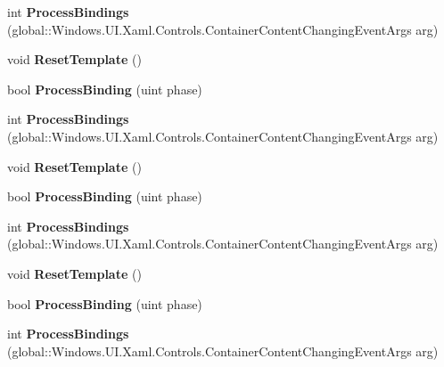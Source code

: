 \begin{DoxyCompactItemize}
int {\bfseries Process\+Bindings} (global\+::\+Windows.\+U\+I.\+Xaml.\+Controls.\+Container\+Content\+Changing\+Event\+Args arg)
\item 
\mbox{\label{interface_windows_1_1_u_i_1_1_xaml_1_1_i_data_template_extension_a247edf28ad06f9d06bda7086a8b91679}} 
void {\bfseries Reset\+Template} ()
\item 
\mbox{\label{interface_windows_1_1_u_i_1_1_xaml_1_1_i_data_template_extension_a9a74e478e1d35040a1bd752b3b29a2da}} 
bool {\bfseries Process\+Binding} (uint phase)
\item 
\mbox{\label{interface_windows_1_1_u_i_1_1_xaml_1_1_i_data_template_extension_a70216df3f493851508fde43160f8a095}} 
int {\bfseries Process\+Bindings} (global\+::\+Windows.\+U\+I.\+Xaml.\+Controls.\+Container\+Content\+Changing\+Event\+Args arg)
\item 
\mbox{\label{interface_windows_1_1_u_i_1_1_xaml_1_1_i_data_template_extension_a247edf28ad06f9d06bda7086a8b91679}} 
void {\bfseries Reset\+Template} ()
\item 
\mbox{\label{interface_windows_1_1_u_i_1_1_xaml_1_1_i_data_template_extension_a9a74e478e1d35040a1bd752b3b29a2da}} 
bool {\bfseries Process\+Binding} (uint phase)
\item 
\mbox{\label{interface_windows_1_1_u_i_1_1_xaml_1_1_i_data_template_extension_a70216df3f493851508fde43160f8a095}} 
int {\bfseries Process\+Bindings} (global\+::\+Windows.\+U\+I.\+Xaml.\+Controls.\+Container\+Content\+Changing\+Event\+Args arg)
\item 
\mbox{\label{interface_windows_1_1_u_i_1_1_xaml_1_1_i_data_template_extension_a247edf28ad06f9d06bda7086a8b91679}} 
void {\bfseries Reset\+Template} ()
\item 
\mbox{\label{interface_windows_1_1_u_i_1_1_xaml_1_1_i_data_template_extension_a9a74e478e1d35040a1bd752b3b29a2da}} 
bool {\bfseries Process\+Binding} (uint phase)
\item 
\mbox{\label{interface_windows_1_1_u_i_1_1_xaml_1_1_i_data_template_extension_a70216df3f493851508fde43160f8a095}} 
int {\bfseries Process\+Bindings} (global\+::\+Windows.\+U\+I.\+Xaml.\+Controls.\+Container\+Content\+Changing\+Event\+Args arg)
\end{DoxyCompactItemize}



